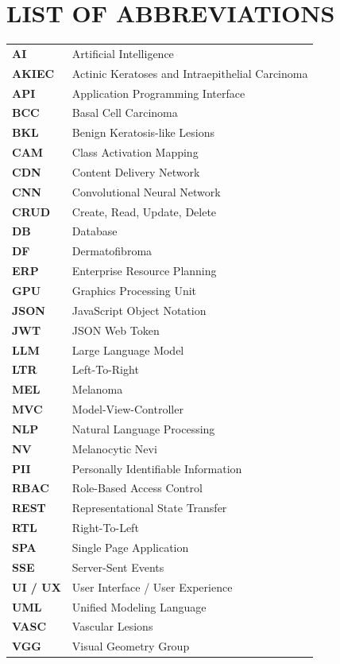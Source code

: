\clearpage
\chapter*{LIST OF ABBREVIATIONS}

\vspace{1cm}

\renewcommand{\arraystretch}{1.2}
\begin{longtable}{@{} >{\bfseries}p{3cm} p{11cm} @{}}
	AI    & Artificial Intelligence \\
	AKIEC & Actinic Keratoses and Intraepithelial Carcinoma \\
	API   & Application Programming Interface \\
	BCC   & Basal Cell Carcinoma \\
	BKL   & Benign Keratosis-like Lesions \\
	CAM   & Class Activation Mapping \\
	CDN   & Content Delivery Network \\
	CNN   & Convolutional Neural Network \\
	CRUD  & Create, Read, Update, Delete \\
	DB    & Database \\
	DF    & Dermatofibroma \\
	ERP   & Enterprise Resource Planning \\
	GPU   & Graphics Processing Unit \\
	JSON  & JavaScript Object Notation \\
	JWT   & JSON Web Token \\
	LLM   & Large Language Model \\
	LTR   & Left-To-Right \\
	MEL   & Melanoma \\
	MVC   & Model-View-Controller \\
	NLP   & Natural Language Processing \\
	NV    & Melanocytic Nevi \\
	PII   & Personally Identifiable Information \\
	RBAC  & Role-Based Access Control \\
	REST  & Representational State Transfer \\
	RTL   & Right-To-Left \\
	SPA   & Single Page Application \\
	SSE   & Server-Sent Events \\
	UI / UX & User Interface / User Experience \\
	UML   & Unified Modeling Language \\
	VASC  & Vascular Lesions \\
	VGG   & Visual Geometry Group \\
\end{longtable}
\newpage
